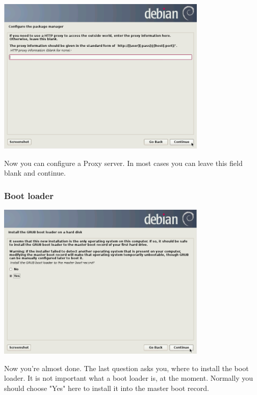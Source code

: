 \documentclass[a4paper,12pt,twoside]{article}
\begin{document}
\begin{minipage}{\linewidth}
    \centering
    \includegraphics[width=10cm]{efaLiveen-img/efaLiveen-img17.png}
    \label{fig:select_proxy}
\end{minipage}

Now you can configure a Proxy server. In most cases you can leave this
field blank and continue.


\subsubsection{Boot loader}
\label{sct:boot_loader}

\begin{minipage}{\linewidth}
    \centering
    \includegraphics[width=10cm]{efaLiveen-img/efaLiveen-img18.png}
    \label{fig:inst_grub}
\end{minipage}

Now you're almost done. The last question asks you,
where to install the boot loader. It is not important what a boot
loader is, at the moment. Normally you should choose
"Yes" here to install it into the master
boot record.
\end{document}
